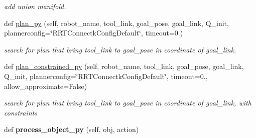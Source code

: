 \begin{DoxyCompactItemize}
\begin{DoxyCompactList}\small\item\em add union manifold. \end{DoxyCompactList}\item 
def \hyperlink{classrnb-planning_1_1src_1_1pkg_1_1planning_1_1motion_1_1moveit_1_1moveit__py_1_1_moveit_compact_planner___b_p_af7d587144e0c713bff12b9a8adcb657f}{plan\+\_\+py} (self, robot\+\_\+name, tool\+\_\+link, goal\+\_\+pose, goal\+\_\+link, Q\+\_\+init, plannerconfig=\char`\"{}R\+R\+T\+Connectk\+Config\+Default\char`\"{}, timeout=0.)
\begin{DoxyCompactList}\small\item\em search for plan that bring tool\+\_\+link to goal\+\_\+pose in coordinate of goal\+\_\+link. \end{DoxyCompactList}\item 
def \hyperlink{classrnb-planning_1_1src_1_1pkg_1_1planning_1_1motion_1_1moveit_1_1moveit__py_1_1_moveit_compact_planner___b_p_a198127e6f947eb2985903741317cab09}{plan\+\_\+constrained\+\_\+py} (self, robot\+\_\+name, tool\+\_\+link, goal\+\_\+pose, goal\+\_\+link, Q\+\_\+init, plannerconfig=\char`\"{}R\+R\+T\+Connectk\+Config\+Default\char`\"{}, timeout=0., allow\+\_\+approximate=False)
\begin{DoxyCompactList}\small\item\em search for plan that bring tool\+\_\+link to goal\+\_\+pose in coordinate of goal\+\_\+link, with constraints \end{DoxyCompactList}\item 
\mbox{\label{classrnb-planning_1_1src_1_1pkg_1_1planning_1_1motion_1_1moveit_1_1moveit__py_1_1_moveit_compact_planner___b_p_a981bb9c271c6f49d37a98fe68526e74a}} 
def {\bfseries process\+\_\+object\+\_\+py} (self, obj, action)
\end{DoxyCompactItemize}
